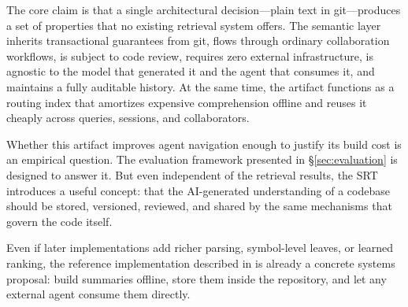\documentclass[11pt,a4paper]{article}
\newcommand{\srt}{\textsc{SRT}}
\begin{document}
The core claim is that a single architectural decision---plain text in git---produces a set of properties that no existing retrieval system offers.
The semantic layer inherits transactional guarantees from git, flows through ordinary collaboration workflows, is subject to code review, requires zero external infrastructure, is agnostic to the model that generated it and the agent that consumes it, and maintains a fully auditable history.
At the same time, the artifact functions as a routing index that amortizes expensive comprehension offline and reuses it cheaply across queries, sessions, and collaborators.

Whether this artifact improves agent navigation enough to justify its build cost is an empirical question.
The evaluation framework presented in \S\ref{sec:evaluation} is designed to answer it.
But even independent of the retrieval results, the \srt{} introduces a useful concept: that the AI-generated understanding of a codebase should be stored, versioned, reviewed, and shared by the same mechanisms that govern the code itself.

Even if later implementations add richer parsing, symbol-level leaves, or learned ranking, the reference implementation described in  is already a concrete systems proposal: build summaries offline, store them inside the repository, and let any external agent consume them directly.
\end{document}

